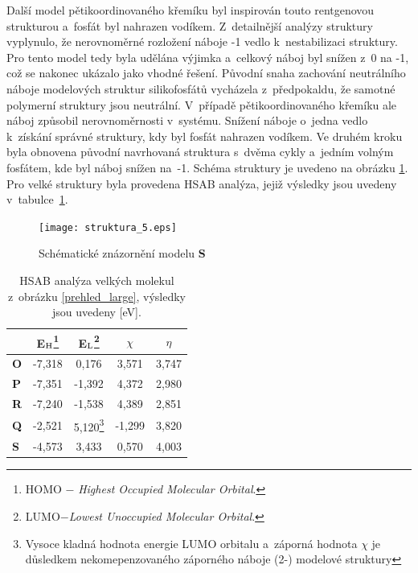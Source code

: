 \documentclass[
digital, %
table,   %
lof,     %
lot,     %
oneside,
]{fithesis3}
\begin{document}
Další model pětikoordinovaného křemíku byl inspirován touto rentgenovou strukturou a~fosfát byl nahrazen vodíkem. Z~detailnější analýzy struktury vyplynulo, že nerovnoměrné rozložení náboje -1 vedlo k~nestabilizaci struktury. Pro tento model tedy byla udělána výjimka a~celkový náboj byl snížen z~0 na -1, což se nakonec ukázalo jako vhodné řešení. Původní snaha zachování neutrálního náboje modelových struktur silikofosfátů vycházela z~předpokaldu, že samotné polymerní struktury jsou neutrální. V~případě pětikoordinovaného křemíku ale náboj způsobil nerovnoměrnosti v~systému. Snížení náboje o~jedna vedlo k~získání správné struktury, kdy byl fosfát nahrazen vodíkem. Ve druhém kroku byla obnovena původní navrhovaná struktura s~dvěma cykly a~jedním volným fosfátem, kde byl náboj snížen na~-1. Schéma struktury je uvedeno na obrázku \ref{schema_5}. Pro velké struktury byla provedena HSAB analýza, jejiž výsledky jsou uvedeny v~tabulce~\ref{hsab_large}.\\
\begin{figure}\begin{center}\texttt{[image: struktura\_5.eps]}
\caption{Schématické znázornění modelu \textbf{S}}\label{schema_5}
\end{center}\end{figure}

\begin{table}[H]
\begin{minipage}{\textwidth}
\caption{HSAB analýza velkých molekul z~obrázku \ref{prehled_large}, výsledky jsou uvedeny [eV].}
\begin{center}
\begin{tabular}{|l|c|c|c|c|}
\hline
\label{hsab_large} & E$_{\ce{H}}$\footnote{HOMO $-$ \textit{Highest Occupied Molecular Orbital}.}  & E$_{\ce{L}}$\footnote{LUMO$ - $\textit{Lowest Unoccupied Molecular Orbital}.} & $\chi$  & $\eta$  \\ \hline
\textbf{O} & -7,318 & 0,176 & 3,571 & 3,747 \\ \hline
\textbf{P} & -7,351 & -1,392 & 4,372 & 2,980 \\ \hline
\textbf{R} & -7,240 & -1,538 & 4,389 & 2,851 \\ \hline
\textbf{Q} & -2,521 & 5,120\footnote{Vysoce kladná hodnota energie LUMO orbitalu a~záporná hodnota $\chi$ je důsledkem nekomepenzovaného záporného náboje (2-) modelové struktury} & -1,299 & 3,820 \\ \hline
\textbf{S} & -4,573 & 3,433 & 0,570 & 4,003 \\ \hline
\end{tabular}
\end{center}
\end{minipage}
\end{table}
\end{document}
